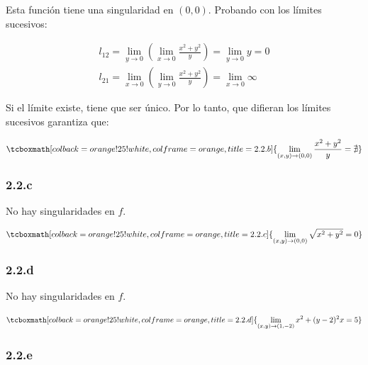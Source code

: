 \documentclass{article}
\begin{document}
Esta función tiene una singularidad en $(0, 0)$. Probando con los límites sucesivos:

\begin{align}
l_{12} = \lim_{y \rightarrow 0} \left( \lim_{x \rightarrow 0} \frac{x^2 + y^2}{y} \right) = \lim_{y \rightarrow 0} y = 0 \\
l_{21} = \lim_{x \rightarrow 0} \left( \lim_{y \rightarrow 0} \frac{x^2 + y^2}{y} \right) = \lim_{x \rightarrow 0} \infty
\end{align}

Si el límite existe, tiene que ser único. Por lo tanto, que difieran los límites sucesivos garantiza que:

\begin{equation}
\tcboxmath[colback=orange!25!white,colframe=orange,title=2.2.b]
{ \lim_{(x,y) \rightarrow (0,0)} \frac{x^2 + y^2}{y} = \nexists }
\end{equation}

\subsubsection*{2.2.c}
\label{subsubsec:2.2.c}

No hay singularidades en $f$.

\begin{equation}
\tcboxmath[colback=orange!25!white,colframe=orange,title=2.2.c]
{ \lim_{(x,y) \rightarrow (0,0)} \sqrt{x^2 + y^2} = 0 }
\end{equation}

\subsubsection*{2.2.d}
\label{subsubsec:2.2.d}

No hay singularidades en $f$.

\begin{equation}
\tcboxmath[colback=orange!25!white,colframe=orange,title=2.2.d]
{ \lim_{(x,y) \rightarrow (1,-2)} x^2 + (y-2)^2 x = 5 }
\end{equation}

\subsubsection*{2.2.e}
\label{subsubsec:2.2.e}
\end{document}
